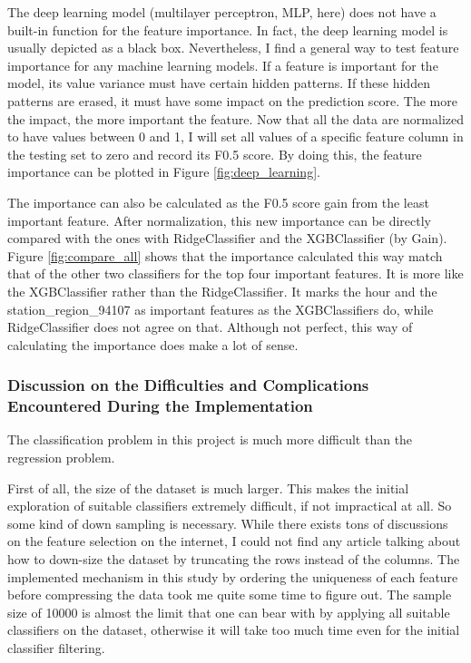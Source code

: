 \documentclass[a4paper]{article}
\begin{document}
			The deep learning model (multilayer perceptron, MLP, here) does not have a built-in function for the feature importance. In fact, the deep learning model is usually depicted as a black box. Nevertheless, I find a general way to test feature importance for any machine learning models. If a feature is important for the model, its value variance must have certain hidden patterns. If these hidden patterns are erased, it must have some impact on the prediction score. The more the impact, the more important the feature. Now that all the data are normalized to have values between 0 and 1, I will set all values of a specific feature column in the testing set to zero and record its F0.5 score. By doing this, the feature importance can be plotted in Figure \ref{fig:deep_learning}. 
			
			The importance can also be calculated as the F0.5 score gain from the least important feature. After normalization, this new importance can be directly compared with the ones with RidgeClassifier and the XGBClassifier (by Gain). Figure \ref{fig:compare_all} shows that the importance calculated this way match that of the other two classifiers for the top four important features. It is more like the XGBClassifier rather than the RidgeClassifier. It marks the hour and the station\_region\_94107 as important features as the XGBClassifiers do, while RidgeClassifier does not agree on that. Although not perfect, this way of calculating the importance does make a lot of sense.
			
			\subsubsection{Discussion on the Difficulties and Complications Encountered During the Implementation}
			
			The classification problem in this project is much more difficult than the regression problem.
			
			First of all, the size of the dataset is much larger. This makes the initial exploration of suitable classifiers extremely difficult, if not impractical at all. So some kind of down sampling is necessary. While there exists tons of discussions on the feature selection on the internet, I could not find any article talking about how to down-size the dataset by truncating the rows instead of the columns. The implemented mechanism in this study by ordering the uniqueness of each feature before compressing the data took me quite some time to figure out. The sample size of 10000 is almost the limit that one can bear with by applying all suitable classifiers on the dataset, otherwise it will take too much time even for the initial classifier filtering.
			
\end{document}
